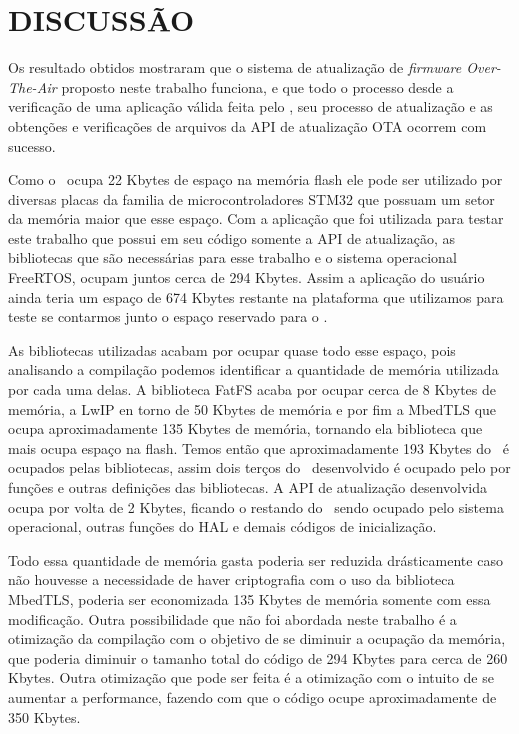 \section{DISCUSSÃO}
Os resultado obtidos mostraram que o sistema de atualização de \textit{firmware Over-The-Air} proposto neste trabalho funciona, e que todo o processo desde a verificação de uma aplicação válida feita pelo \bootloader, seu processo de atualização e as obtenções e verificações de arquivos da API de atualização OTA ocorrem com sucesso.

Como o \bootloader\ ocupa 22 Kbytes de espaço na memória flash ele pode ser utilizado por diversas placas da familia de microcontroladores STM32 que possuam um setor da memória maior que esse espaço. Com a aplicação que foi utilizada para testar este trabalho que possui em seu código somente a API de atualização, as bibliotecas que são necessárias para esse trabalho e o sistema operacional FreeRTOS, ocupam juntos cerca de 294 Kbytes. Assim a aplicação do usuário ainda teria um espaço de 674 Kbytes restante na plataforma que utilizamos para teste se contarmos junto o espaço reservado para o \bootloader. 

As bibliotecas utilizadas acabam por ocupar quase todo esse espaço, pois analisando a compilação podemos identificar a quantidade de memória utilizada por cada uma delas. A biblioteca FatFS acaba por ocupar cerca de 8 Kbytes de memória, a LwIP en torno de 50 Kbytes de memória e por fim a MbedTLS que ocupa aproximadamente 135 Kbytes de memória, tornando ela biblioteca que mais ocupa espaço na flash. Temos então que aproximadamente 193 Kbytes do \firmware\ é ocupados pelas bibliotecas, assim dois terços do \firmware\ desenvolvido é ocupado pelo por funções e outras definições das bibliotecas. A API de atualização desenvolvida ocupa por volta de 2 Kbytes, ficando o restando do \firmware\ sendo ocupado pelo sistema operacional, outras funções do HAL e demais códigos de inicialização.

Todo essa quantidade de memória gasta poderia ser reduzida drásticamente caso não houvesse a necessidade de haver criptografia com o uso da biblioteca MbedTLS, poderia ser economizada 135 Kbytes de memória somente com essa modificação. Outra possibilidade que não foi abordada neste trabalho é a otimização da compilação com o objetivo de se diminuir a ocupação da memória, que poderia diminuir o tamanho total do código de 294 Kbytes para cerca de 260 Kbytes. Outra otimização que pode ser feita é a otimização com o intuito de se aumentar a performance, fazendo com que o código ocupe aproximadamente de 350 Kbytes.


